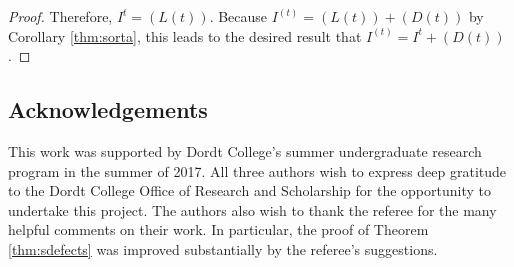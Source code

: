 \documentclass[12pt]{amsart}
\theoremstyle{plain}
\theoremstyle{definition}
\begin{document}
\begin{proof}
Therefore, $I^t = (L(t))$. 
Because $I^{(t)} = (L(t)) + (D(t))$ by Corollary \ref{thm:sorta}, this leads to the desired result that $I^{(t)} = I^t + (D(t))$.
\end{proof}

\subsection*{Acknowledgements} This work was supported by Dordt College's summer undergraduate research program in the summer of 2017. All three authors wish to express deep gratitude to the Dordt College Office of Research and Scholarship for the opportunity to undertake this project.
The authors also wish to thank the referee for the many helpful comments on their work. In particular, the proof of Theorem \ref{thm:sdefects} was improved substantially by the referee's suggestions.


{}

\end{document}
